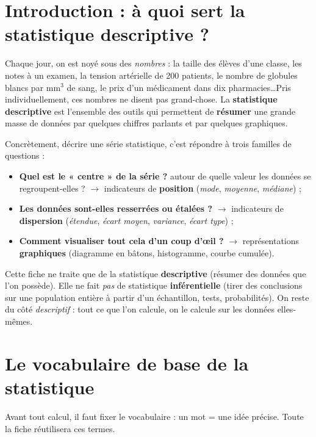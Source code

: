 \documentclass[11pt,a4paper]{article}
\begin{document}
\section{Introduction : à quoi sert la statistique descriptive ?}
Chaque jour, on est noyé sous des \emph{nombres} : la taille des élèves d'une classe, les notes à un
examen, la tension artérielle de 200 patients, le nombre de globules blancs par mm$^3$ de sang,
le prix d'un médicament dans dix pharmacies\ldots Pris individuellement, ces nombres ne disent pas
grand-chose. La \textbf{statistique descriptive} est l'ensemble des outils qui permettent de
\textbf{résumer} une grande masse de données par quelques chiffres parlants et par quelques
graphiques.

Concrètement, décrire une série statistique, c'est répondre à trois familles de questions :
\begin{itemize}[leftmargin=1.7em,topsep=2pt,itemsep=1pt]
  \item \textbf{Quel est le « centre » de la série ?} autour de quelle valeur les données
        se regroupent-elles ? $\rightarrow$ indicateurs de \textbf{position}
        (\emph{mode}, \emph{moyenne}, \emph{médiane}) ;
  \item \textbf{Les données sont-elles resserrées ou étalées ?} $\rightarrow$ indicateurs de
        \textbf{dispersion} (\emph{étendue}, \emph{écart moyen}, \emph{variance}, \emph{écart type}) ;
  \item \textbf{Comment visualiser tout cela d'un coup d'œil ?} $\rightarrow$ représentations
        \textbf{graphiques} (diagramme en bâtons, histogramme, courbe cumulée).
\end{itemize}

\begin{remarque}
Cette fiche ne traite que de la statistique \textbf{descriptive} (résumer des données que l'on
possède). Elle ne fait \emph{pas} de statistique \textbf{inférentielle} (tirer des conclusions sur
une population entière à partir d'un échantillon, tests, probabilités). On reste du côté
\emph{descriptif} : tout ce que l'on calcule, on le calcule sur les données elles-mêmes.
\end{remarque}

\section{Le vocabulaire de base de la statistique}
Avant tout calcul, il faut fixer le vocabulaire : un mot = une idée précise. Toute la fiche
réutilisera ces termes.
\end{document}
